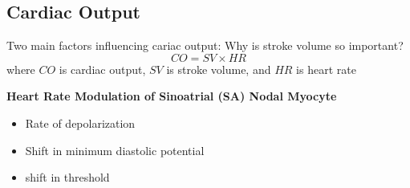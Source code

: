\documentclass[11pt,fleqn]{book} %
\begin{document}
\newpage
\subsection{Cardiac Output}
\begin{theorem}
    Two main factors influencing cariac output: Why is stroke volume so important?
    $$CO=SV\times HR$$
    where $CO$ is cardiac output, $SV$ is stroke volume, and $HR$ is heart rate
\end{theorem}

\textbf{Heart Rate Modulation of
Sinoatrial (SA) Nodal Myocyte}
\begin{itemize}
    \item Rate of depolarization
    \item Shift in minimum diastolic potential\
    \item shift in threshold
\end{itemize}
\end{document}
